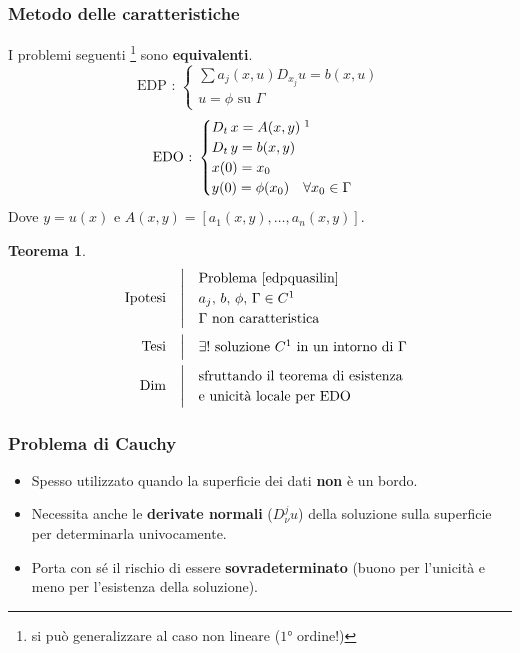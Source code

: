 \documentclass[serif,notheorems]{beamer}
\makeatletter
\newenvironment{ipotesi}%
{\quad\left|\quad\def\arraystretch{1.2}\begin{array}{@{}l@{}}}%
{\end{array}\right.}
\newcommand{\hpthdim}[3]
{
\begin{align*}
\quad
\text{Ipotesi}
&\begin{ipotesi} 
#1
\end{ipotesi}\\
\text{Tesi}
&\begin{ipotesi}
#2
\end{ipotesi}\\
\text{Dim}
&\begin{ipotesi}
#3
\end{ipotesi}
\end{align*}
}
\theoremstyle{definition} %
\newtheorem{theorem}{Teorema}[section] %
\theoremstyle{remark}
\makeatother
\begin{document}
\begin{frame}
\frametitle{Metodo delle caratteristiche}
I problemi seguenti \footnote{si può generalizzare al caso non lineare ($1$° ordine!)} sono \textbf{equivalenti}.
\begin{equation} \label{edpquasilin}
\text{EDP : }
\begin{cases}
\sum a_j(x,u)D_{x_j} u = b(x,u)\\
u = \phi \text{ su } \Gamma
\end{cases} 
\end{equation}
\begin{equation}
\text{EDO : }
\begin{cases}
D_t \, x = A(x,y) \; \footnotemark \\
D_t \, y = b(x,y)\\ 
x(0)=x_0\\ 
y(0) = \phi (x_0) \quad \forall x_0 \in \Gamma
\end{cases} 
\end{equation}
Dove $y = u(x)$ e $A(x,y)=[a_1(x,y),\ldots ,a_n(x,y)]$.
\end{frame}

\begin{frame}
\begin{theorem}
\hpthdim{
\text{Problema \eqref{edpquasilin} } \\
a_j, \, b, \, \phi , \, \Gamma \in C^1\\
\Gamma \text{ non caratteristica}
}{
\exists ! \text{ soluzione } C^1 \text{ in un intorno di } \Gamma
}
{
\text{sfruttando il teorema di esistenza}\\ \text{e unicità locale per EDO}
}
\end{theorem}
\end{frame}

\begin{frame}
\frametitle{Problema di Cauchy}
\begin{itemize}
\item Spesso utilizzato quando la superficie dei dati \textbf{non} è un bordo.
\item Necessita anche le \textbf{derivate normali} ($D^j_\nu u$) della soluzione sulla superficie per determinarla univocamente.
\item Porta con sé il rischio di essere \textbf{sovradeterminato} (buono per l'unicità e meno per l'esistenza della soluzione).
\end{itemize}
\end{frame}
\end{document}
